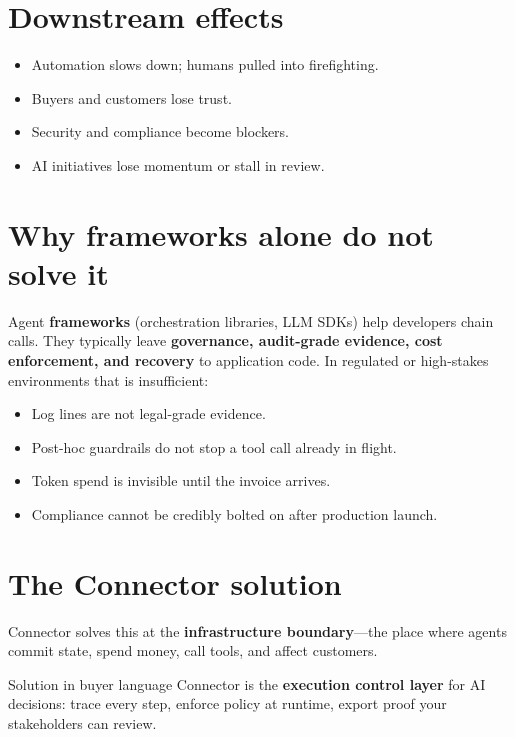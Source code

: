 \section{Downstream effects}

\begin{itemize}
  \item Automation slows down; humans pulled into firefighting.
  \item Buyers and customers lose trust.
  \item Security and compliance become blockers.
  \item AI initiatives lose momentum or stall in review.
\end{itemize}

\section{Why frameworks alone do not solve it}

Agent \textbf{frameworks} (orchestration libraries, LLM SDKs) help developers chain calls. They typically leave \textbf{governance, audit-grade evidence, cost enforcement, and recovery} to application code. In regulated or high-stakes environments that is insufficient:

\begin{itemize}
  \item Log lines are not legal-grade evidence.
  \item Post-hoc guardrails do not stop a tool call already in flight.
  \item Token spend is invisible until the invoice arrives.
  \item Compliance cannot be credibly bolted on after production launch.
\end{itemize}

\section{The Connector solution}

Connector solves this at the \textbf{infrastructure boundary}---the place where agents commit state, spend money, call tools, and affect customers.

\begin{conceptbox}{Solution in buyer language}
Connector is the \textbf{execution control layer} for AI decisions: trace every step, enforce policy at runtime, export proof your stakeholders can review.
\end{conceptbox}

